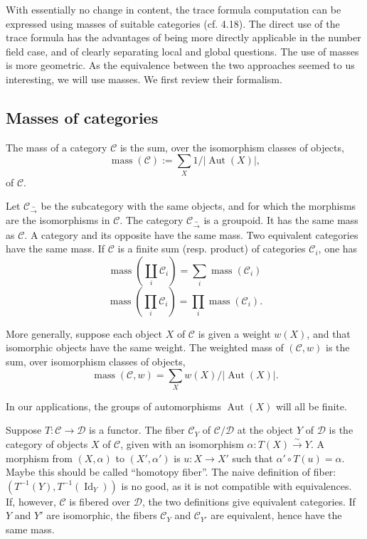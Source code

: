 \documentclass[11pt,a4paper]{article}
\theoremstyle{plain}
\theoremstyle{definition}
\DeclareMathOperator{\Aut}{Aut}
\DeclareMathOperator{\Id}{Id}
\DeclareMathOperator{\mass}{mass}
\newcommand{\isom}{\xrightarrow{\sim}}
\begin{document}
With essentially no change in content, the trace formula computation can be expressed using masses of suitable categories (cf. 4.18). The direct use of the trace formula has the advantages of being more directly applicable in the number field case, and of clearly separating local and global questions. The use of masses is more geometric. As the equivalence between the two approaches seemed to us interesting, we will use masses. We first review their formalism.

\subsection{Masses of categories}

The mass of a category $\mathcal{C}$ is the sum, over the isomorphism classes of objects,
\begin{equation}
\mass(\mathcal{C}) := \sum_X 1/|\Aut(X)|, \tag{4.10.1}
\end{equation}
of $\mathcal{C}$.

Let $\mathcal{C}_{\isom}$ be the subcategory with the same objects, and for which the morphisms are the isomorphisms in $\mathcal{C}$. The category $\mathcal{C}_{\isom}$ is a groupoid. It has the same mass as $\mathcal{C}$. A category and its opposite have the same mass. Two equivalent categories have the same mass. If $\mathcal{C}$ is a finite sum (resp. product) of categories $\mathcal{C}_i$, one has
\begin{equation}
\mass(\coprod_i \mathcal{C}_i) = \sum_i \mass(\mathcal{C}_i) \tag{4.10.2}
\end{equation}
\begin{equation}
\mass(\prod_i \mathcal{C}_i) = \prod_i \mass(\mathcal{C}_i). \tag{4.10.3}
\end{equation}

More generally, suppose each object $X$ of $\mathcal{C}$ is given a weight $w(X)$, and that isomorphic objects have the same weight. The weighted mass of $(\mathcal{C}, w)$ is the sum, over isomorphism classes of objects,
\begin{equation}
\mass(\mathcal{C}, w) = \sum_X w(X)/|\Aut(X)|. \tag{4.10.4}
\end{equation}

In our applications, the groups of automorphisms $\Aut(X)$ will all be finite.

Suppose $T: \mathcal{C} \to \mathcal{D}$ is a functor. The fiber $\mathcal{C}_Y$ of $\mathcal{C}/\mathcal{D}$ at the object $Y$ of $\mathcal{D}$ is the category of objects $X$ of $\mathcal{C}$, given with an isomorphism $\alpha: T(X) \xrightarrow{\sim} Y$. A morphism from $(X, \alpha)$ to $(X', \alpha')$ is $u: X \to X'$ such that $\alpha' \circ T(u) = \alpha$. Maybe this should be called ``homotopy fiber''. The naive definition of fiber: $(T^{-1}(Y), T^{-1}(\Id_Y))$ is no good, as it is not compatible with equivalences. If, however, $\mathcal{C}$ is fibered over $\mathcal{D}$, the two definitions give equivalent categories. If $Y$ and $Y'$ are isomorphic, the fibers $\mathcal{C}_Y$ and $\mathcal{C}_{Y'}$ are equivalent, hence have the same mass.
\end{document}
